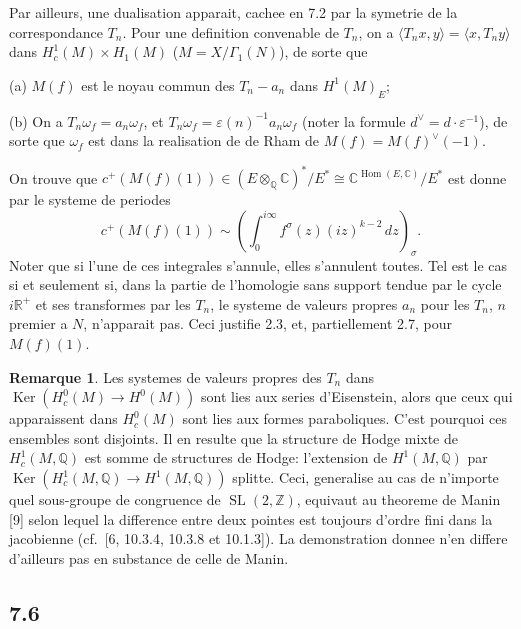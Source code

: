 \documentclass[12pt,a4paper]{article}
\theoremstyle{plain}
\theoremstyle{definition}
\newtheorem{remark}[definition]{Remarque}
\theoremstyle{remark}
\DeclareMathOperator{\Hom}{Hom}
\DeclareMathOperator{\Ker}{Ker}
\DeclareMathOperator{\SL}{SL}
\newcommand{\Q}{\mathbb{Q}}
\newcommand{\R}{\mathbb{R}}
\newcommand{\C}{\mathbb{C}}
\newcommand{\Z}{\mathbb{Z}}
\begin{document}
Par ailleurs, une dualisation apparait, cachee en 7.2 par la symetrie de la
correspondance $T_n$. Pour une definition convenable de $T_n$, on a
$\langle T_n x, y \rangle = \langle x, T_n y \rangle$ dans $H^1_c(M) \times H_1(M)$ ($M = X/\Gamma_1(N)$), de
sorte que

(a) $M(f)$ est le noyau commun des $T_n - a_n$ dans $H^1(M)_E$;

(b) On a $T_n \omega_f = a_n \omega_f$, et $T_n \omega_f = \varepsilon(n)^{-1} a_n \omega_f$ (noter la formule
$d^\vee = d \cdot \varepsilon^{-1}$), de sorte que $\omega_f$ est dans la realisation de de Rham de $M(f) = M(f)^\vee(-1)$.

On trouve que $c^+(M(f)(1)) \in (E \otimes_\Q \C)^*/E^* \cong \C^{\Hom(E,\C)}/E^*$
est donne par le systeme de periodes
\[
c^+(M(f)(1)) \sim \left(\int_0^{i\infty} f^\sigma(z) (iz)^{k-2} \, dz\right)_\sigma.
\]
Noter que si l'une de ces integrales s'annule, elles s'annulent toutes. Tel est le cas si
et seulement si, dans la partie de l'homologie sans support tendue par le cycle
$i\R^+$ et ses transformes par les $T_n$, le systeme de valeurs propres $a_n$ pour les
$T_n$, $n$ premier a $N$, n'apparait pas. Ceci justifie 2.3, et, partiellement 2.7, pour
$M(f)(1)$.

\begin{remark}
Les systemes de valeurs propres des $T_n$ dans
$\Ker(H^0_c(M) \to H^0(M))$ sont lies aux series d'Eisenstein, alors que ceux qui
apparaissent dans $H^0_c(M)$ sont lies aux formes paraboliques. C'est pourquoi ces
ensembles sont disjoints. Il en resulte que la structure de Hodge mixte de
$H^1_c(M, \Q)$ est somme de structures de Hodge: l'extension de $H^1(M, \Q)$ par
$\Ker(H^1_c(M, \Q) \to H^1(M, \Q))$ splitte. Ceci, generalise au cas de n'importe
quel sous-groupe de congruence de $\SL(2, \Z)$, equivaut au theoreme de Manin [9]
selon lequel la difference entre deux pointes est toujours d'ordre fini dans la
jacobienne (cf.~[6, 10.3.4, 10.3.8 et 10.1.3]). La demonstration donnee n'en differe
d'ailleurs pas en substance de celle de Manin.
\end{remark}

\subsection*{7.6}
\end{document}
